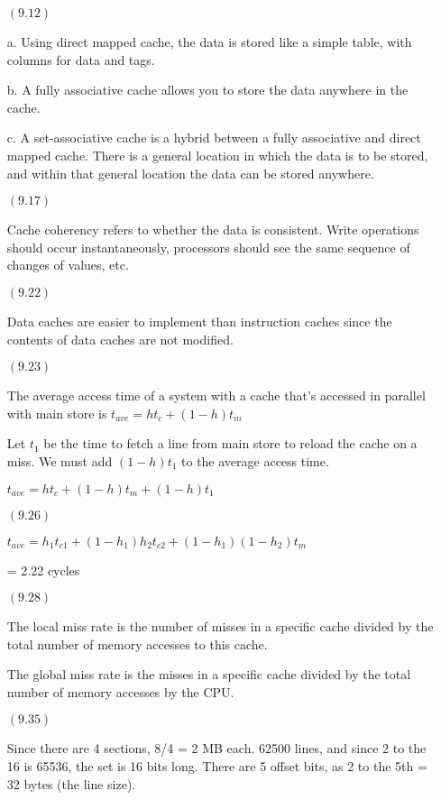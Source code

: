 \documentclass[letterpaper,10pt,titlepage]{article}
\begin{document}
\begin{enumerate}
\item[$(9.12)$]
  
  a.  Using direct mapped cache, the data is stored like a simple table, with columns for data and tags.
 
  b.  A fully associative cache allows you to store the data anywhere in the cache.

  c.  A set-associative cache is a hybrid between a fully associative and direct mapped cache.  There is a general location in which the data is to be stored, and within that general location the data can be stored anywhere.
  
\item[$(9.17)$]

  Cache coherency refers to whether the data is consistent.  Write operations should occur instantaneously, processors should see the same sequence of changes of values, etc.
  
\item[$(9.22)$]

  Data caches are easier to implement than instruction caches since the contents of data caches are not modified.

\item[$(9.23)$]

  The average access time of a system with a cache that's accessed in parallel with main store is $t_{ave} = ht_{c} + (1-h)t_{m}$
  
  Let $t_{1}$ be the time to fetch a line from main store to reload the cache on a miss.  We must add $(1-h)t_{1}$ to the average access time.
  
  $t_{ave} = ht_{c} + (1-h)t_{m} + (1-h)t_{1}$

\item[$(9.26)$]

  $t_{ave} = h_{1}t_{c1} + (1 - h_{1})h_{2}t_{c2} + (1 - h_{1})(1 - h_{2})t_{m}$
  
  = 2.22 cycles

\item[$(9.28)$]

  The local miss rate is the number of misses in a specific cache divided by the total number of memory accesses to this cache.
  
  The global miss rate is the misses in a specific cache divided by the total number of memory accesses by the CPU.

\item[$(9.35)$]

  Since there are 4 sections, 8/4 = 2 MB each. 62500 lines, and since 2 to the 16 is 65536, the set is 16 bits long. There
  are 5 offset bits, as 2 to the 5th = 32 bytes (the line size).


\end{enumerate}
\end{document}
